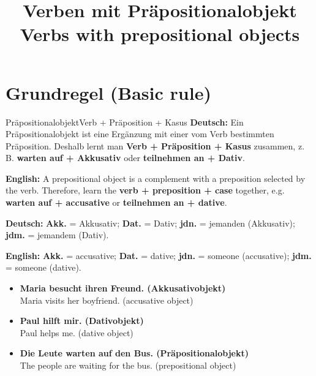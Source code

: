 \documentclass[a4paper,11pt]{article}
\title{Verben mit Präpositionalobjekt\\{\large Verbs with prepositional objects}}
\date{}
\newcommand{\GermanText}[1]{\textbf{Deutsch: }#1\par}
\newcommand{\EnglishText}[1]{{\small\color{SoftGray}\textbf{English: }#1\par}}
\newcommand{\ExampleItem}[2]{\item \textbf{#1}\\{\small\color{SoftGray}#2}}
\begin{document}
\maketitle
\tableofcontents
\newpage
\section{Grundregel (Basic rule)}
\begin{grammarentry}{Präpositionalobjekt}{Verb + Präposition + Kasus}
\GermanText{Ein Präpositionalobjekt ist eine Ergänzung mit einer vom Verb bestimmten Präposition. Deshalb lernt man \textbf{Verb + Präposition + Kasus} zusammen, z.\,B. \textbf{warten auf + Akkusativ} oder \textbf{teilnehmen an + Dativ}.}
\EnglishText{A prepositional object is a complement with a preposition selected by the verb. Therefore, learn the \textbf{verb + preposition + case} together, e.g. \textbf{warten auf + accusative} or \textbf{teilnehmen an + dative}.}
\GermanText{\textbf{Akk.} = Akkusativ; \textbf{Dat.} = Dativ; \textbf{jdn.} = jemanden (Akkusativ); \textbf{jdm.} = jemandem (Dativ).}
\EnglishText{\textbf{Akk.} = accusative; \textbf{Dat.} = dative; \textbf{jdn.} = someone (accusative); \textbf{jdm.} = someone (dative).}
\end{grammarentry}

\begin{exbox}
\begin{itemize}
\ExampleItem{Maria besucht ihren Freund. (Akkusativobjekt)}{Maria visits her boyfriend. (accusative object)}
\ExampleItem{Paul hilft mir. (Dativobjekt)}{Paul helps me. (dative object)}
\ExampleItem{Die Leute warten auf den Bus. (Präpositionalobjekt)}{The people are waiting for the bus. (prepositional object)}
\end{itemize}
\end{exbox}
\end{document}

